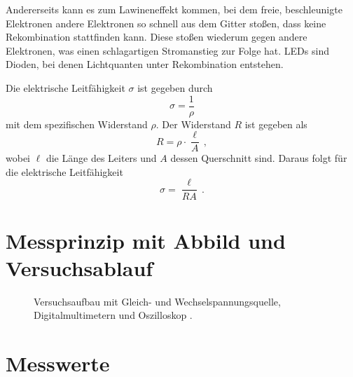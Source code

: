 \documentclass[
12pt,
a4paper,
bibliography=totocnumbered, %
BCOR=1cm, %
oneside, %
]{scrartcl}
\newcommand{\lh}{\ell_{\mathrm{H}}}
\begin{document}
Andererseits kann es zum Lawineneffekt kommen, bei dem freie, beschleunigte Elektronen andere Elektronen so schnell aus dem Gitter stoßen, dass keine Rekombination stattfinden kann. Diese stoßen wiederum gegen andere Elektronen, was einen schlagartigen Stromanstieg zur Folge hat.
LEDs sind Dioden, bei denen Lichtquanten unter Rekombination entstehen.

Die elektrische Leitfähigkeit \(\sigma\) ist gegeben durch
\begin{equation}
	\sigma = \frac{1}{\rho}
\end{equation}
mit dem spezifischen Widerstand \(\rho\).
Der Widerstand \(R\) ist gegeben als
\begin{equation}
	R = \rho \cdot \frac{\ell}{A} \,,
\end{equation}
wobei \(\ell\) die Länge des Leiters und \(A\) dessen Querschnitt sind. Daraus folgt für die elektrische Leitfähigkeit
\begin{equation}\label{eq:Leitfähigkeit}
	\sigma = \frac{\ell}{RA} \,.
\end{equation}

\section[Messprinzip]{Messprinzip mit Abbild und Versuchsablauf}

\begin{figure}[H]
	\caption{Versuchsaufbau mit Gleich- und Wechselspannungsquelle, Digitalmultimetern und Oszilloskop \cite{Quelle}.}
	\label{fig:Aufbau}
\end{figure}



\section{Messwerte}
\end{document}
